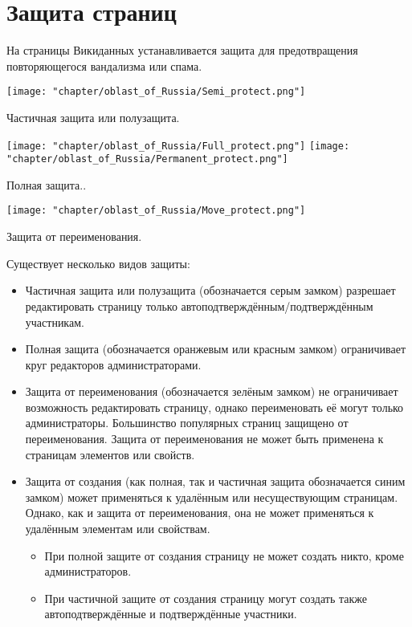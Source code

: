 \chapter{Защита страниц}
\label{protection}

На страницы Викиданных устанавливается защита для предотвращения повторяющегося вандализма или спама. 

\begin{marginfigure}[5.0cm]
{
	\setlength{\fboxsep}{0pt}%
	\setlength{\fboxrule}{1pt}%
	{\texttt{[image: "chapter/oblast\_of\_Russia/Semi\_protect.png"]}}
}
\caption [Иконка. Частичная защита или полузащита.]{Частичная защита или полузащита.}%
\label{fig:legend_population}%
\end{marginfigure}

\begin{marginfigure}[0.0cm]
{
	\setlength{\fboxsep}{0pt}%
	\setlength{\fboxrule}{1pt}%
	{\texttt{[image: "chapter/oblast\_of\_Russia/Full\_protect.png"]}}
	{\texttt{[image: "chapter/oblast\_of\_Russia/Permanent\_protect.png"]}}
}
\caption [Иконка. Полная защита.]{Полная защита..}%
\label{fig:legend_population}%
\end{marginfigure}

\begin{marginfigure}[0.0cm]
{
	\setlength{\fboxsep}{0pt}%
	\setlength{\fboxrule}{1pt}%
	{\texttt{[image: "chapter/oblast\_of\_Russia/Move\_protect.png"]}}
}
\caption [Иконка. Защита от переименования.]{Защита от переименования.}%
\label{fig:legend_population}%
\end{marginfigure}

Существует несколько видов защиты:
\begin{itemize}
  \item Частичная защита или полузащита (обозначается серым замком) разрешает редактировать страницу только автоподтверждённым/подтверждённым участникам.
  \item Полная защита (обозначается оранжевым или красным замком) ограничивает круг редакторов администраторами.
  \item Защита от переименования (обозначается зелёным замком) не ограничивает возможность редактировать страницу, однако переименовать её могут только администраторы. Большинство популярных страниц защищено от переименования. Защита от переименования не может быть применена к страницам элементов или свойств.
  \item Защита от создания (как полная, так и частичная защита обозначается синим замком) может применяться к удалённым или несуществующим страницам. Однако, как и защита от переименования, она не может применяться к удалённым элементам или свойствам.
  \begin{itemize}
	\item При полной защите от создания страницу не может создать никто, кроме администраторов.
	\item При частичной защите от создания страницу могут создать также автоподтверждённые и подтверждённые участники.
  \end{itemize}
\end{itemize}

